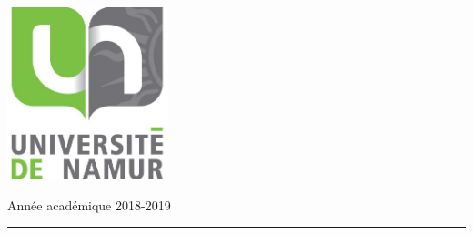 \documentclass[12pt,a4paper]{report}
\newcommand\blankpage{%
	\null
	\thispagestyle{empty}%
	\addtocounter{page}{-1}%
	\newpage}
\begin{document}
\begin{titlepage}
		\vfill
		\includegraphics[height=5cm]{graphics/logo.png}
		\vfill\vfill\vfill %
		
		{\large Année académique 2018-2019} %
		
		
		
		
		\vfill %
\newpage\null\thispagestyle{empty}\newpage
	\end{titlepage}

	\tableofcontents
	
	
	
	
	
	
	
	
	\begin{center}
		\rule{15cm}{3pt}
	\end{center}

	
\end{document}
